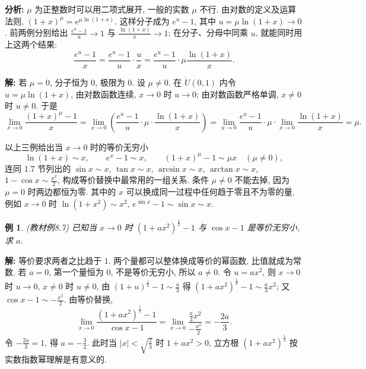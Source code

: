 \documentclass[UTF8,openany]{ctexbook}
\theoremstyle{chinesetextbook}
\newtheorem{example}{例}[section]
\newenvironment{cnsolution}{\par\indent\textbf{解:} \ignorespaces}{\par}
\begin{document}
\par\indent\textbf{分析:} $\mu$ 为正整数时可以用二项式展开, 一般的实数 $\mu$ 不行. 由对数的定义及运算法则, $(1+x)^\mu=e^{\mu\ln(1+x)}$. 这样分子成为 $e^u-1$, 其中 $u=\mu\ln(1+x)\to0$. 前两例分别给出 $\displaystyle\frac{e^u-1}u\to1$ 与 $\displaystyle\frac{\ln(1+x)}x\to1$; 在分子、分母中同乘 $u$, 就能同时用上这两个结果:
\[
\frac{e^u-1}x=\frac{e^u-1}u\cdot\frac ux=\frac{e^u-1}u\cdot\mu\frac{\ln(1+x)}x.
\]
\begin{cnsolution}
若 $\mu=0$, 分子恒为 $0$, 极限为 $0$. 设 $\mu\ne0$. 在 $\mathring U(0,1)$ 内令 $u=\mu\ln(1+x)$, 由对数函数连续, $x\to0$ 时 $u\to0$; 由对数函数严格单调, $x\ne0$ 时 $u\ne0$. 于是
\[
\lim_{x\to0}\frac{(1+x)^\mu-1}x=\lim_{x\to0}\left(\frac{e^u-1}u\cdot\mu\cdot\frac{\ln(1+x)}x\right)=\lim_{u\to0}\frac{e^u-1}u\cdot\mu\cdot\lim_{x\to0}\frac{\ln(1+x)}x=\mu.
\]
\end{cnsolution}
以上三例给出当 $x\to0$ 时的等价无穷小
\[
\ln(1+x)\sim x,\qquad e^x-1\sim x,\qquad(1+x)^\mu-1\sim\mu x\quad(\mu\ne0),
\]
连同 1.7 节列出的 $\sin x\sim x$, $\tan x\sim x$, $\arcsin x\sim x$, $\arctan x\sim x$, $\displaystyle1-\cos x\sim\frac{x^2}2$, 构成等价替换中最常用的一组关系. 条件 $\mu\ne0$ 不能去掉, 因为 $\mu=0$ 时两边都恒为零. 其中的 $x$ 可以换成同一过程中任何趋于零且不为零的量, 例如 $x\to0$ 时 $\ln(1+x^2)\sim x^2$, $e^{\sin x}-1\sim\sin x\sim x$.
\begin{example}
\textnormal{(教材例8.7)} 已知当 $x\to0$ 时 $(1+ax^2)^{\frac13}-1$ 与 $\cos x-1$ 是等价无穷小, 求 $a$.
\end{example}
\begin{cnsolution}
等价要求两者之比趋于 $1$. 两个量都可以整体换成等价的幂函数, 比值就成为常数. 若 $a=0$, 第一个量恒为 $0$, 不是等价无穷小, 所以 $a\ne0$. 令 $u=ax^2$, 则 $x\to0$ 时 $u\to0$, $x\ne0$ 时 $u\ne0$, 由 $\displaystyle(1+u)^{\frac13}-1\sim\frac u3$ 得 $\displaystyle(1+ax^2)^{\frac13}-1\sim\frac a3x^2$; 又 $\displaystyle\cos x-1\sim-\frac{x^2}2$. 由等价替换,
\[
\lim_{x\to0}\frac{(1+ax^2)^{\frac13}-1}{\cos x-1}=\lim_{x\to0}\frac{\frac a3x^2}{-\frac{x^2}2}=-\frac{2a}3.
\]
令 $\displaystyle-\frac{2a}3=1$, 得 $\displaystyle a=-\frac32$. 此时当 $\displaystyle|x|<\sqrt{\frac23}$ 时 $1+ax^2>0$, 立方根 $(1+ax^2)^{\frac13}$ 按实数指数幂理解是有意义的.
\end{cnsolution}
\end{document}
